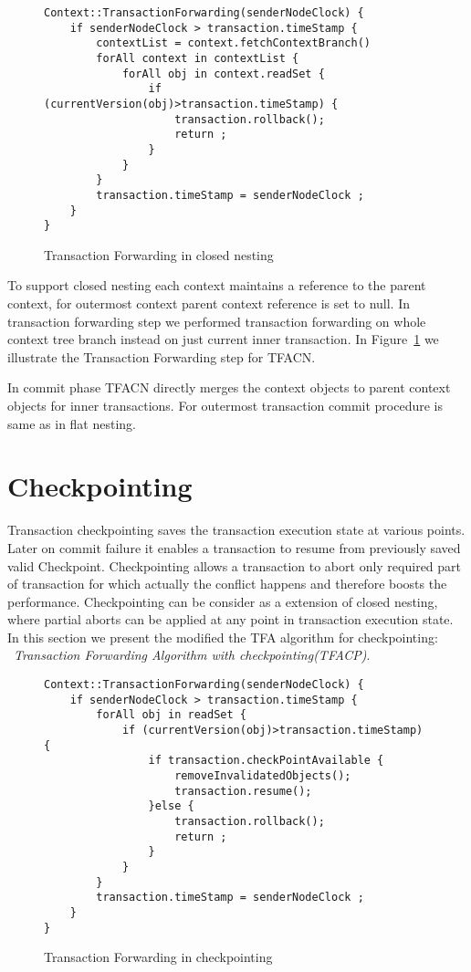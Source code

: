 \documentclass[12pt,english]{report}
\begin{document}
\begin{figure}[H]
\begin{minipage}[b]{0.9\linewidth}\centering
\begin{lstlisting}
Context::TransactionForwarding(senderNodeClock) {
	if senderNodeClock > transaction.timeStamp {
		contextList = context.fetchContextBranch()
		forAll context in contextList {
			forAll obj in context.readSet {
				if (currentVersion(obj)>transaction.timeStamp) { 
					transaction.rollback();
					return ;
				}		
			}
		}
		transaction.timeStamp = senderNodeClock ; 
	}
}
\end{lstlisting}
\end{minipage}
\caption{Transaction Forwarding in closed nesting}
\label{Fig:CloseTFA}
\end{figure} 

To support closed nesting each context maintains a reference to the parent context, for outermost context parent context reference is set to null. In transaction forwarding step we performed transaction forwarding on whole context tree branch instead on just current inner transaction. In Figure~\ref{Fig:CloseTFA} we illustrate the Transaction Forwarding step for TFACN.

In commit phase TFACN directly merges the context objects to parent context objects for inner transactions. For outermost transaction commit procedure is same as in flat nesting. 

\section{Checkpointing}

Transaction checkpointing saves the transaction execution state at various points. Later on commit failure it enables a transaction to resume from previously saved valid Checkpoint. Checkpointing allows a transaction to abort only required part of transaction for which actually the conflict happens and therefore boosts the performance. Checkpointing can be consider as a extension of closed nesting, where partial aborts can be applied at any point in transaction execution state. In this section we present  the modified the TFA algorithm for checkpointing: ~\emph{Transaction Forwarding Algorithm with checkpointing(TFACP)}.

\begin{figure}[H]
\begin{minipage}[b]{0.9\linewidth}\centering
\begin{lstlisting}
Context::TransactionForwarding(senderNodeClock) {
	if senderNodeClock > transaction.timeStamp {
		forAll obj in readSet {
			if (currentVersion(obj)>transaction.timeStamp) { 
				if transaction.checkPointAvailable {
					removeInvalidatedObjects();
					transaction.resume();
				}else {
					transaction.rollback();
					return ;
				}		
			}
		}
		transaction.timeStamp = senderNodeClock ; 
	}
}
\end{lstlisting}
\end{minipage}
\caption{Transaction Forwarding in checkpointing}
\label{Fig:CheckPointTFA}
\end{figure} 
\end{document}
